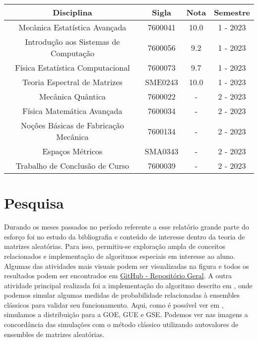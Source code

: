 \documentclass[12pt]{report}
\begin{document}
	\hspace{1cm}
	
	\begin{center}
		\begin{tabular}{|c|c|c|c|}
			\hline
			Disciplina & Sigla & Nota & Semestre \\
			\hline
			Mecânica Estatística Avançada & 7600041 & 10.0 & 1 - 2023 \\
			\hline
			Introdução aos Sistemas de Computação & 7600056 & 9.2 & 1 - 2023 \\
			\hline
			Física Estatística Computacional & 7600073 & 9.7 & 1 - 2023 \\
			\hline
			Teoria Espectral de Matrizes & SME0243 & 10.0 & 1 - 2023 \\
			\hline
			Mecânica Quântica & 7600022 & - & 2 - 2023 \\
			\hline
			Física Matemática Avançada & 7600034 & - & 2 - 2023 \\
			\hline
			Noções Básicas de Fabricação Mecânica & 7600134 & - & 2 - 2023 \\
			\hline
			Espaços Métricos & SMA0343 & - & 2 - 2023 \\
			\hline
			Trabalho de Conclusão de Curso & 7600039 & - & 2 - 2023 \\
			\hline
		\end{tabular}
	\end{center}
	
	\section{Pesquisa}
	
	Durando os meses passados no período referente a esse relatório grande parte do esforço foi no estudo da bibliografia e conteúdo de interesse dentro da teoria de matrizes aleatórias. Para isso, permitiu-se exploração ampla de conceitos relacionados e implementação de algoritmos especiais em interesse ao aluno. Algumas das atividades mais visuais podem ser visualizadas na figura  e todos os resultados podem ser encontrados em \href{https://github.com/Joao-vap/RMT-Code/tree/main}{GitHub - Repositório Geral}. A outra atividade principal realizada foi a implementação do algoritmo descrito em \cite{Chafa__2018}, onde podemos simular algumas medidas de probabilidade relacionadas à ensembles clássicos para validar seu funcionamento. Aqui, como é possível ver em , simulamos a distribuição para a GOE, GUE e GSE. Podemos ver nas imagens a concordância das simulações com o método clássico utilizando autovalores de ensembles de matrizes aleatórias.
\end{document}
